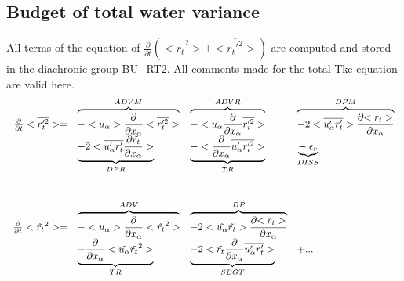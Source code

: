 \subsection{Budget of total water variance}


All terms of the equation of $\frac{\partial}{\partial t} (<\tilde{r_t}^2> + <\overline{r_t'^2}>)$ are
computed and stored in the diachronic group BU\_RT2. 
All comments made for the total Tke equation are valid here.\\

\begin{displaymath}
\left.
\begin{array}{rllll}
\frac{\partial }{\partial t} <\overline{r_t'^2}> = & 
\overbrace{- <u_\alpha>\frac{\partial}{\partial x_\alpha} <\overline{r_t'^2}> }^{ADVM}  &
\overbrace{- <\tilde{u_\alpha}\frac{\partial}{\partial x_\alpha} \overline{r_t'^2} > }^{ADVR} &
\overbrace{- 2 <\overline{u_\alpha'r_t'}> \frac{\partial {<r_t>}}{\partial x_\alpha} }^{DPM} \\
\vspace*{1.0cm}
& \underbrace{- 2 <\overline{u'_\alpha r_t'} \frac{\partial {\tilde{r_t}}}{\partial x_\alpha}>}_{DPR}  &
 \underbrace{- <\frac{\partial}{\partial x_\alpha} \overline{u'_\alpha r_t'^2}>}_{TR}
 & \underbrace{-\; \epsilon_{r}}_{DISS}\\
\frac{\partial }{\partial t} <\tilde{r_t}^2> = & 
\overbrace{- <u_\alpha>\frac{\partial}{\partial x_\alpha} <\tilde{r_t}^2> }^{ADV} &
\overbrace{- 2<\tilde{u_\alpha} \tilde{r_t}> \frac{\partial {<r_t>}}{\partial x_\alpha}}^{DP} &\\
& \underbrace{- \frac{\partial}{\partial x_\alpha} <\tilde{u_\alpha} \tilde{r_t}^2>}_{TR} &
\underbrace{- 2 <\tilde{r_t}\frac{\partial}{\partial x_\alpha}\overline{u'_\alpha r_t'}>}_{SBGT} & + ...
\end{array}
\right.
\end{displaymath}
